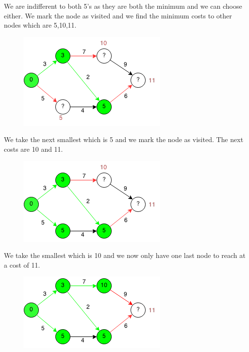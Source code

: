 \documentclass[11pt,oneside]{book}
\makeatletter
\def\maxwidth#1{\ifdim\Gin@nat@width>#1 #1\else\Gin@nat@width\fi}
\makeatother
\begin{document}
We are indifferent to both 5's as they are both the minimum and we can choose either. We mark the node as visited and we find the minimum costs to other nodes which are 5,10,11.

\vspace{5px}\begin{figure}[H]\centering
        \includegraphics[width=0.66\maxwidth{\textwidth}]{djikstra3.png}
        \end{figure}

We take the next smallest which is 5 and we mark the node as visited. The next costs are 10 and 11.

\vspace{5px}\begin{figure}[H]\centering
        \includegraphics[width=0.66\maxwidth{\textwidth}]{djikstra4.png}
        \end{figure}

We take the smallest which is 10 and we now only have one last node to reach at a cost of 11.

\vspace{5px}\begin{figure}[H]\centering
        \includegraphics[width=0.66\maxwidth{\textwidth}]{djikstra5.png}
        \end{figure}
\end{document}
